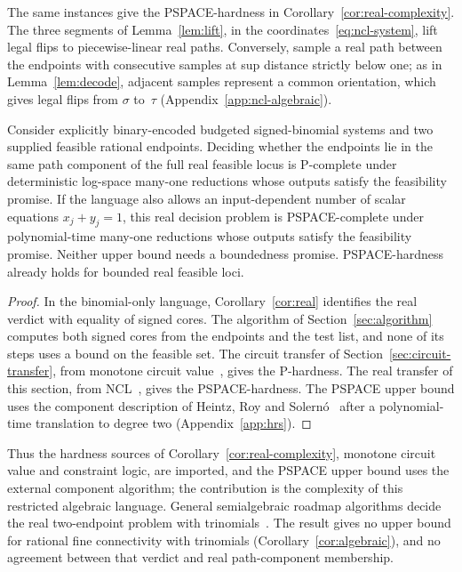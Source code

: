 The same instances give the PSPACE-hardness in
Corollary~\ref{cor:real-complexity}. The three segments of
Lemma~\ref{lem:lift}, in the coordinates~\eqref{eq:ncl-system}, lift legal
flips to piecewise-linear real paths. Conversely, sample a real path
between the endpoints with consecutive samples at sup distance strictly
below one; as in Lemma~\ref{lem:decode}, adjacent samples represent a
common orientation, which gives legal flips from $\sigma$ to~$\tau$
(Appendix~\ref{app:ncl-algebraic}).

\begin{corollary}\label{cor:real-complexity}
Consider explicitly binary-encoded budgeted signed-binomial systems and two
supplied feasible rational endpoints. Deciding whether the endpoints lie in
the same path component of the full real feasible locus is P-complete under
deterministic log-space many-one reductions whose outputs satisfy the
feasibility promise.
If the language also allows an input-dependent number of scalar equations
$x_j+y_j=1$, this real decision problem is PSPACE-complete under
polynomial-time many-one reductions whose outputs satisfy the feasibility
promise. Neither upper bound needs a boundedness promise. PSPACE-hardness
already holds for bounded real feasible loci.
\end{corollary}

\begin{proof}
In the binomial-only language, Corollary~\ref{cor:real} identifies the
real verdict with equality of signed cores.
The algorithm of Section~\ref{sec:algorithm} computes both signed cores from the
endpoints and the test list, and none of its steps uses a bound on the
feasible set. The circuit transfer of Section~\ref{sec:circuit-transfer},
from monotone circuit value~\cite{goldschlager}, gives the P-hardness. The
real transfer of this section, from NCL~\cite{hearndemaine}, gives the
PSPACE-hardness. The PSPACE upper bound uses the component description of
Heintz, Roy and Solern\'o~\cite{heintzroysolerno1994components} after a
polynomial-time translation to degree two (Appendix~\ref{app:hrs}).
\end{proof}

Thus the hardness sources of Corollary~\ref{cor:real-complexity},
monotone circuit value and constraint logic, are imported, and the PSPACE upper bound uses the external component algorithm; the contribution is the complexity of this restricted
algebraic language. General semialgebraic roadmap algorithms decide the
real two-endpoint problem with trinomials~\cite{basupollackroy}. The
result gives no upper bound for rational fine connectivity with
trinomials (Corollary~\ref{cor:algebraic}), and no agreement between that
verdict and real path-component membership.

